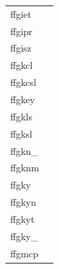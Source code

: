 \documentclass[11pt]{book}
\begin{document}
\begin{tabular}{lr}
ffgiet & \pageref{ffgidt} \\
ffgipr & \pageref{ffgipr} \\
ffgisz & \pageref{ffgisz} \\
ffgkcl      & \pageref{ffgkcl} \\
ffgkcsl & \pageref{ffgkcsl} \\
ffgkey      & \pageref{ffgkey} \\
ffgkls  & \pageref{ffgkls} \\
ffgksl  & \pageref{ffgksl} \\
ffgkn\_     & \pageref{ffgknx} \\
ffgknm    & \pageref{ffgknm} \\
ffgky          & \pageref{ffgky} \\
ffgkyn         & \pageref{ffgkyn} \\
ffgkyt   & \pageref{ffgkyt} \\
ffgky\_      & \pageref{ffgkyx} \\
ffgmcp   & \pageref{ffgmcp} \\

\end{tabular}
\end{document}
